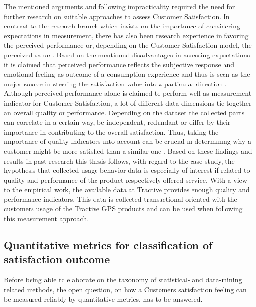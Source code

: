 The mentioned arguments and following impracticality required the need for further research on suitable approaches to assess Customer Satisfaction. In contrast to the research branch which insists on the importance of considering expectations in measurement, there has also been research experience in favoring the perceived performance or, depending on the Customer Satisfaction model, the perceived value \cite{yuksel1998customer}. Based on the mentioned disadvantages in assessing expectations it is claimed that perceived performance reflects the subjective response and emotional feeling as outcome of a consumption experience and thus is seen as the major source in steering the satisfaction value into a particular direction \cite{halstead1994multisource} \cite{cronin1992measuring}. Although perceived performance alone is claimed to perform well as measurement indicator for Customer Satisfaction, a lot of different data dimensions tie together an overall quality or performance. Depending on the dataset the collected parts can correlate in a certain way, be independent, redundant or differ by their importance in contributing to the overall satisfaction. Thus, taking the importance of quality indicators into account can be crucial in determining why a customer might be more satisfied than a similar one \cite{barsky1992customer}. Based on these findings and results in past research this thesis follows, with regard to the case study, the hypothesis that collected usage behavior data is especially of interest if related to quality and performance of the product respectively offered service. With a view to the empirical work, the available data at Tractive provides enough quality and performance indicators. This data is collected transactional-oriented with the customers usage of the Tractive GPS products and can be used when following this measurement approach. 

\subsection{Quantitative metrics for classification of satisfaction outcome}
\label{ssec:quantitativeMetrics}
Before being able to elaborate on the taxonomy of statistical- and data-mining related methods, the open question, on how a Customers satisfaction feeling can be measured reliably by quantitative metrics, has to be answered. 

